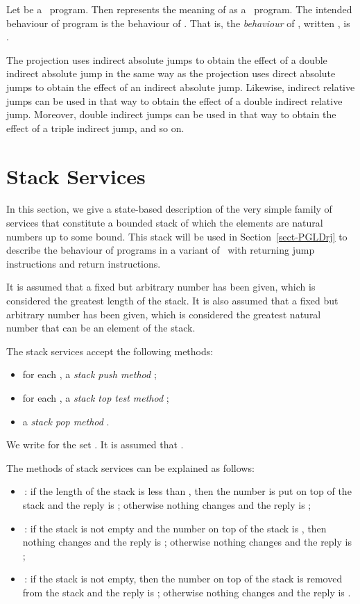 \documentclass[fleqn]{llncs}
\begin{document}
Let  be a \PGLDdij\ program.
Then  represents the meaning of  as a \PGLDij\
program.
The intended behaviour of program  is the behaviour of .
That is, the \emph{behaviour} of , written ,
is .

The projection  uses indirect absolute jumps to obtain
the effect of a double indirect absolute jump in the same way as the
projection  uses direct absolute jumps to obtain the effect
of an indirect absolute jump.
Likewise, indirect relative jumps can be used in that way to obtain the
effect of a double indirect relative jump.
Moreover, double indirect jumps can be used in that way to obtain the
effect of a triple indirect jump, and so on.

\section{Stack Services}
\label{sect-stack}

In this section, we give a state-based description of the very simple
family of services that constitute a bounded stack of which the elements
are natural numbers up to some bound.
This stack will be used in Section~\ref{sect-PGLDrj} to describe the
behaviour of programs in a variant of \PGLD\ with returning jump
instructions and return instructions.

It is assumed that a fixed but arbitrary number  has been given,
which is considered the greatest length of the stack.
It is also assumed that a fixed but arbitrary number  has been
given, which is considered the greatest natural number that can be an
element of the stack.

The stack services accept the following methods:
\begin{itemize}
\item
for each , a \emph{stack push method} ;
\item
for each , a \emph{stack top test method} ;
\item
a \emph{stack pop method} .
\end{itemize}
We write  for the set
.
It is assumed that .

The methods of stack services can be explained as follows:
\begin{itemize}
\item
\,:
if the length of the stack is less than , then the number  is
put on top of the stack and the reply is ;  otherwise nothing
changes and the reply is ;
\item
\,:
if the stack is not empty and the number on top of the stack is ,
then nothing changes and the reply is ; otherwise nothing changes
and the reply is ;
\item
\,:
if the stack is not empty, then the number on top of the stack is
removed from the stack and the reply is ; otherwise nothing
changes and the reply is .
\end{itemize}
\end{document}
